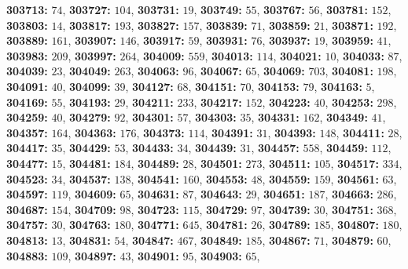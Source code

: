 \textsf{\bfseries 303713:} $74$, \textsf{\bfseries 303727:} $104$, \textsf{\bfseries 303731:} $19$, \textsf{\bfseries 303749:} $55$, \textsf{\bfseries 303767:} $56$, \textsf{\bfseries 303781:} $152$, \textsf{\bfseries 303803:} $14$, \textsf{\bfseries 303817:} $193$, \textsf{\bfseries 303827:} $157$, \textsf{\bfseries 303839:} $71$, \textsf{\bfseries 303859:} $21$, \textsf{\bfseries 303871:} $192$, \textsf{\bfseries 303889:} $161$, \textsf{\bfseries 303907:} $146$, \textsf{\bfseries 303917:} $59$, \textsf{\bfseries 303931:} $76$, \textsf{\bfseries 303937:} $19$, \textsf{\bfseries 303959:} $41$, \textsf{\bfseries 303983:} $209$, \textsf{\bfseries 303997:} $264$, \textsf{\bfseries 304009:} $559$, \textsf{\bfseries 304013:} $114$, \textsf{\bfseries 304021:} $10$, \textsf{\bfseries 304033:} $87$, \textsf{\bfseries 304039:} $23$, \textsf{\bfseries 304049:} $263$, \textsf{\bfseries 304063:} $96$, \textsf{\bfseries 304067:} $65$, \textsf{\bfseries 304069:} $703$, \textsf{\bfseries 304081:} $198$, \textsf{\bfseries 304091:} $40$, \textsf{\bfseries 304099:} $39$, \textsf{\bfseries 304127:} $68$, \textsf{\bfseries 304151:} $70$, \textsf{\bfseries 304153:} $79$, \textsf{\bfseries 304163:} $5$, \textsf{\bfseries 304169:} $55$, \textsf{\bfseries 304193:} $29$, \textsf{\bfseries 304211:} $233$, \textsf{\bfseries 304217:} $152$, \textsf{\bfseries 304223:} $40$, \textsf{\bfseries 304253:} $298$, \textsf{\bfseries 304259:} $40$, \textsf{\bfseries 304279:} $92$, \textsf{\bfseries 304301:} $57$, \textsf{\bfseries 304303:} $35$, \textsf{\bfseries 304331:} $162$, \textsf{\bfseries 304349:} $41$, \textsf{\bfseries 304357:} $164$, \textsf{\bfseries 304363:} $176$, \textsf{\bfseries 304373:} $114$, \textsf{\bfseries 304391:} $31$, \textsf{\bfseries 304393:} $148$, \textsf{\bfseries 304411:} $28$, \textsf{\bfseries 304417:} $35$, \textsf{\bfseries 304429:} $53$, \textsf{\bfseries 304433:} $34$, \textsf{\bfseries 304439:} $31$, \textsf{\bfseries 304457:} $558$, \textsf{\bfseries 304459:} $112$, \textsf{\bfseries 304477:} $15$, \textsf{\bfseries 304481:} $184$, \textsf{\bfseries 304489:} $28$, \textsf{\bfseries 304501:} $273$, \textsf{\bfseries 304511:} $105$, \textsf{\bfseries 304517:} $334$, \textsf{\bfseries 304523:} $34$, \textsf{\bfseries 304537:} $138$, \textsf{\bfseries 304541:} $160$, \textsf{\bfseries 304553:} $48$, \textsf{\bfseries 304559:} $159$, \textsf{\bfseries 304561:} $63$, \textsf{\bfseries 304597:} $119$, \textsf{\bfseries 304609:} $65$, \textsf{\bfseries 304631:} $87$, \textsf{\bfseries 304643:} $29$, \textsf{\bfseries 304651:} $187$, \textsf{\bfseries 304663:} $286$, \textsf{\bfseries 304687:} $154$, \textsf{\bfseries 304709:} $98$, \textsf{\bfseries 304723:} $115$, \textsf{\bfseries 304729:} $97$, \textsf{\bfseries 304739:} $30$, \textsf{\bfseries 304751:} $368$, \textsf{\bfseries 304757:} $30$, \textsf{\bfseries 304763:} $180$, \textsf{\bfseries 304771:} $645$, \textsf{\bfseries 304781:} $26$, \textsf{\bfseries 304789:} $185$, \textsf{\bfseries 304807:} $180$, \textsf{\bfseries 304813:} $13$, \textsf{\bfseries 304831:} $54$, \textsf{\bfseries 304847:} $467$, \textsf{\bfseries 304849:} $185$, \textsf{\bfseries 304867:} $71$, \textsf{\bfseries 304879:} $60$, \textsf{\bfseries 304883:} $109$, \textsf{\bfseries 304897:} $43$, \textsf{\bfseries 304901:} $95$, \textsf{\bfseries 304903:} $65$, 
